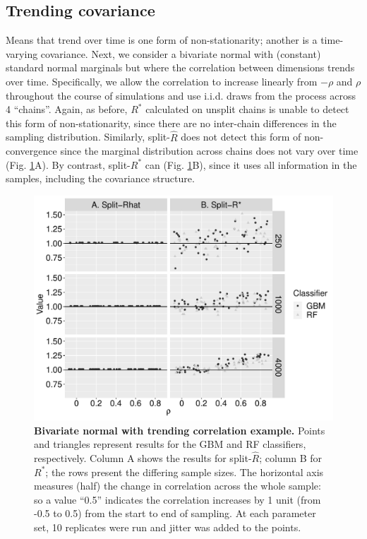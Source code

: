 \documentclass[ba]{imsart}
\numberwithin{equation}{section}
\theoremstyle{plain}
\begin{document}
\begin{supplement}
		\subsection{Trending covariance}\label{sec:non-stationary_covariance}
		Means that trend over time is one form of non-stationarity; another is a time-varying covariance. Next, we consider a bivariate normal with (constant) standard normal marginals but where the correlation between dimensions trends over time. Specifically, we allow the correlation to increase linearly from $-\rho$ and $\rho$ throughout the course of simulations and use i.i.d. draws from the process across 4 ``chains''. Again, as before, $R^*$ calculated on unsplit chains is unable to detect this form of non-stationarity, since there are no inter-chain differences in the sampling distribution. Similarly, split-$\widehat{R}$ does not detect this form of non-convergence since the marginal distribution across chains does not vary over time (Fig. \ref{fig:trends_joint_distribution}A). By contrast, split-$R^*$ can (Fig. \ref{fig:trends_joint_distribution}B), since it uses all information in the samples, including the covariance structure.
		
		\begin{figure}[!htb]
			\centerline{\includegraphics[width=1.0\textwidth]{trends_joint_distribution.pdf}}
			\caption{\textbf{Bivariate normal with trending correlation example.} Points and triangles represent results for the GBM and RF classifiers, respectively. Column A shows the results for split-$\widehat{R}$; column B for $R^*$; the rows present the differing sample sizes. The horizontal axis measures (half) the change in correlation across the whole sample: so a value ``0.5'' indicates the correlation increases by 1 unit (from -0.5 to 0.5) from the start to end of sampling. At each parameter set, 10 replicates were run and jitter was added to the points.}
			\label{fig:trends_joint_distribution}
		\end{figure}
		

\end{supplement}
\end{document}
